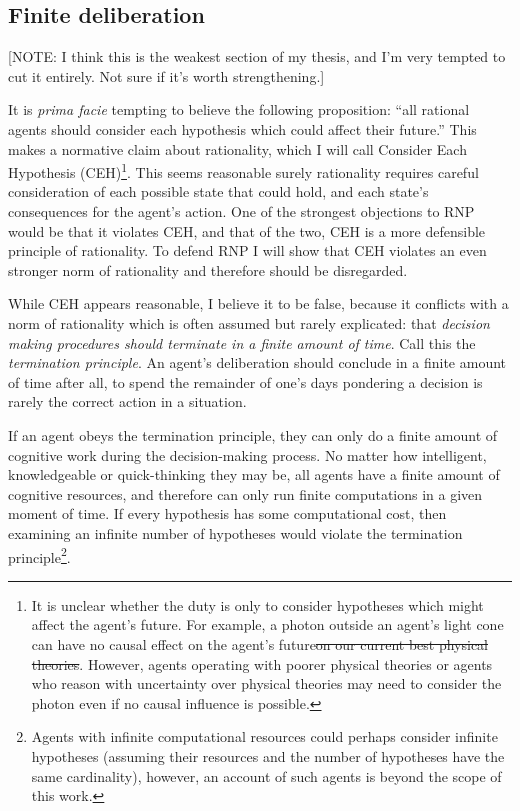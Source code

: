 \documentclass{article}
\providecommand{\DIFadd}[1]{{\protect\color{blue}\uwave{#1}}} %
\providecommand{\DIFdel}[1]{{\protect\color{red}\sout{#1}}}                      %
\providecommand{\DIFaddbegin}{} %
\providecommand{\DIFaddend}{} %
\providecommand{\DIFdelbegin}{} %
\providecommand{\DIFdelend}{} %
\begin{document}
\DIFaddend \subsection{Finite deliberation}

[NOTE: I think this is the weakest section of my thesis, and I'm very tempted to cut it entirely. Not sure if it's worth strengthening.]

It is \textit{prima facie} tempting to believe the following proposition: ``all rational agents should consider each hypothesis which could affect their future.'' This makes a normative claim about rationality, which I will call Consider Each Hypothesis (CEH)\footnote{It is unclear whether the duty is only to consider hypotheses which might affect the agent's future. For example, \DIFaddbegin \DIFadd{on our current best physical theories }\DIFaddend a photon outside an agent's light cone can have no causal effect on the agent's future\DIFdelbegin \DIFdel{on our current best physical theories}\DIFdelend . However, agents operating with poorer physical theories \textemdash{} or agents who reason with uncertainty over physical theories \textemdash{} may need to consider the photon even if no causal influence is possible.}. This seems reasonable \textemdash{} surely rationality requires careful consideration of each possible state that could hold, and each state's consequences for the agent's action. One of the strongest objections to RNP would be that it violates CEH, and that of the two, CEH is a more defensible principle of rationality. To defend RNP I will show that CEH violates an even stronger norm of rationality and therefore should be disregarded.

While CEH appears reasonable, I believe it to be false, because it conflicts with a norm of rationality which is often assumed but rarely explicated: that \textit{decision making procedures should terminate in a finite amount of time}. Call this the \textit{termination principle}. An agent's deliberation should conclude in a finite amount of time \textemdash{} after all, to spend the remainder of one's days pondering a decision is rarely the correct action in a situation. 

If an agent obeys the termination principle, they can only do a finite amount of cognitive work during the decision-making process. No matter how intelligent, knowledgeable or quick-thinking they may be, all agents have a finite amount of cognitive resources, and therefore can only run finite computations in a given moment of time. If every hypothesis has some computational cost, then examining an infinite number of hypotheses would violate the termination principle\footnote{Agents with infinite computational resources could perhaps consider infinite hypotheses (assuming their resources and the number of hypotheses have the same cardinality), however, an account of such agents is beyond the scope of this work.}. 
\end{document}
